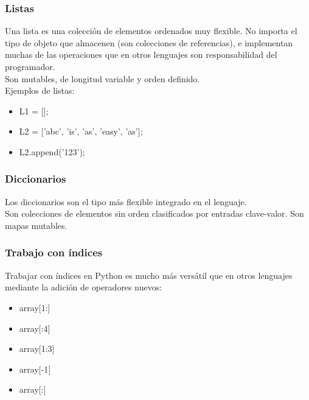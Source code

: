 \documentclass{beamer}
\begin{document}
\begin{frame}
\frametitle{Listas}
Una lista es una colección de elementos ordenados muy flexible. No importa el tipo de objeto que almacenen (son colecciones de referencias), e implementan muchas de las operaciones que en otros lenguajes son responsabilidad del programador.\\
Son mutables, de longitud variable y orden definido.\\
Ejemplos de listas:
\begin{itemize}
\item L1 = [];
\item L2 = ['abc', 'is', 'as', 'easy', 'as'];
\item L2.append('123');
\end{itemize}
\end{frame}

\begin{frame}
\frametitle{Diccionarios}
Los diccionarios son el tipo más flexible integrado en el lenguaje.\\
Son colecciones de elementos sin orden clasificados por entradas clave-valor. Son mapas mutables.
\end{frame}

\begin{frame}
\frametitle{Trabajo con índices}
Trabajar con índices en Python es mucho más versátil que en otros lenguajes mediante la adición de operadores nuevos:
\begin{itemize}
	\item array[1:]
	\item array[:4]
	\item array[1:3]
	\item array[-1]
	\item array[:]
\end{itemize}
\end{frame}
\end{document}
